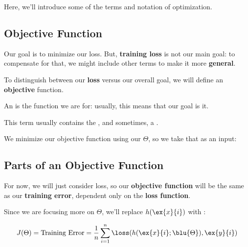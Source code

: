     Here, we'll introduce some of the terms and notation of optimization.
    
    \subsection{Objective Function}
    
        Our goal is to minimize our loss. But, \textbf{training loss} is not our main goal: to compensate for that, we might include other terms to make it more \textbf{general}.
        
        To distinguish between our \textbf{loss} versus our overall goal, we will define an \textbf{objective} function.\\
        
        \begin{definition}
            An  is the function we are  for: usually, this means that our goal is  it.
            
            This term usually contains the , and sometimes, a .
            
            We minimize our objective function using our  $\Theta$, so we take that as an input: 
        \end{definition}
        
        
    \subsection{Parts of an Objective Function}
    
        For now, we will just consider loss, so our \textbf{objective function} will be the same as our \textbf{training error}, dependent only on the \textbf{loss function}.
        
        Since we are focusing more on $\Theta$, we'll replace $h(\ex{x}{i})$ with :
        
        \begin{equation*}
            J(\Theta) = \text{Training Error} = 
            \frac{1}{n}  \sum_{i=1}^n \loss ( h(\ex{x}{i}; \blu{\Theta}), \ex{y}{i} ) 
        \end{equation*}
        
